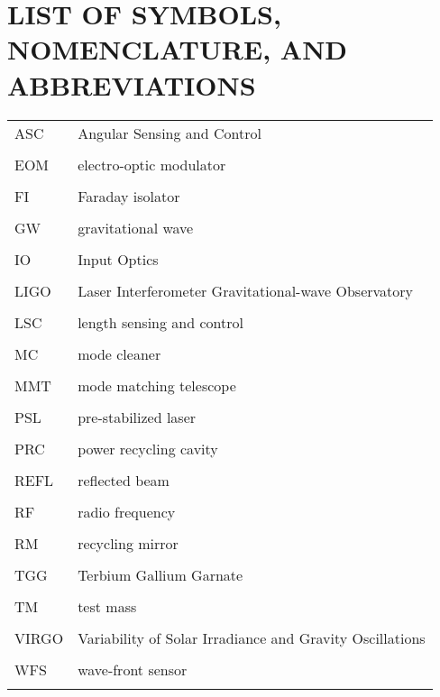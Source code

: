 

\chapter*{LIST OF SYMBOLS, NOMENCLATURE, AND ABBREVIATIONS} 


\singlespacing
\begin{tabular}{lp{5in}}
ASC & Angular Sensing and Control \\
\\
EOM & electro-optic modulator \\
\\
FI & Faraday isolator \\
\\
GW & gravitational wave \\
\\
IO & Input Optics \\
\\
LIGO & Laser Interferometer Gravitational-wave Observatory \\
\\
LSC & length sensing and control \\
\\
MC & mode cleaner \\
\\
MMT & mode matching telescope \\
\\
PSL & pre-stabilized laser \\
\\
PRC & power recycling cavity \\
\\
REFL & reflected beam \\
\\
RF & radio frequency \\
\\
RM & recycling mirror \\
\\
TGG & Terbium Gallium Garnate \\
\\
TM & test mass \\
\\
VIRGO & Variability of Solar Irradiance and Gravity Oscillations \\
\\
WFS & wave-front sensor \\
\\
\end{tabular}
\doublespacing
